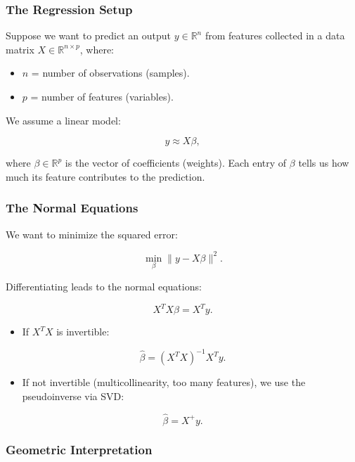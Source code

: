 \documentclass[
  letterpaper,
  DIV=11,
  numbers=noendperiod]{scrreprt}
\providecommand{\tightlist}{%
  \setlength{\itemsep}{0pt}\setlength{\parskip}{0pt}}
\begin{document}
\subsubsection{The Regression Setup}\label{the-regression-setup}

Suppose we want to predict an output \(y \in \mathbb{R}^n\) from
features collected in a data matrix \(X \in \mathbb{R}^{n \times p}\),
where:

\begin{itemize}
\tightlist
\item
  \(n\) = number of observations (samples).
\item
  \(p\) = number of features (variables).
\end{itemize}

We assume a linear model:

\[
y \approx X\beta,
\]

where \(\beta \in \mathbb{R}^p\) is the vector of coefficients
(weights). Each entry of \(\beta\) tells us how much its feature
contributes to the prediction.

\subsubsection{The Normal Equations}\label{the-normal-equations}

We want to minimize the squared error:

\[
\min_\beta \|y - X\beta\|^2.
\]

Differentiating leads to the normal equations:

\[
X^T X \beta = X^T y.
\]

\begin{itemize}
\tightlist
\item
  If \(X^T X\) is invertible:
\end{itemize}

\[
\hat{\beta} = (X^T X)^{-1} X^T y.
\]

\begin{itemize}
\tightlist
\item
  If not invertible (multicollinearity, too many features), we use the
  pseudoinverse via SVD:
\end{itemize}

\[
\hat{\beta} = X^+ y.
\]

\subsubsection{Geometric
Interpretation}\label{geometric-interpretation-18}
\end{document}
